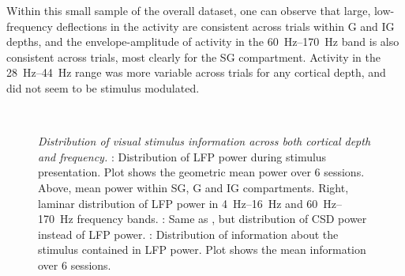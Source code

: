 Within this small sample of the overall dataset, one can observe that large, low-frequency deflections in the activity are consistent across trials within \ac{G} and \ac{IG} depths, and the envelope-amplitude of activity in the \SIrange{60}{170}{Hz} band is also consistent across trials, most clearly for the \ac{SG} compartment.
Activity in the \SIrange{28}{44}{Hz} range was more variable across trials for any cortical depth, and did not seem to be stimulus modulated.


\begin{figure}[htbp]%
    \centering
    \hspace*{\fill}
    \hspace*{\fill}\hspace{.2cm}\hspace*{\fill}
    \hspace*{\fill}
    \\
    \hspace*{\fill}
    \hspace*{\fill}\hspace{.2cm}\hspace*{\fill}
    \hspace*{\fill}
    \caption{
    \textit{Distribution of visual stimulus information across both cortical depth and frequency.}
\protect{}: Distribution of \ac{LFP} power during stimulus presentation.
Plot shows the geometric mean power over \num{6} sessions.
Above, mean power within \ac{SG}, \ac{G} and \ac{IG} compartments.
Right, laminar distribution of \ac{LFP} power in \SIrange{4}{16}{Hz} and \SIrange{60}{170}{Hz} frequency bands.
\protect{}: Same as \protect{}, but distribution of \ac{CSD} power instead of \ac{LFP} power.
\protect{}: Distribution of information about the stimulus contained in \ac{LFP} power.
Plot shows the mean information over \num{6} sessions.
}
\end{figure}
